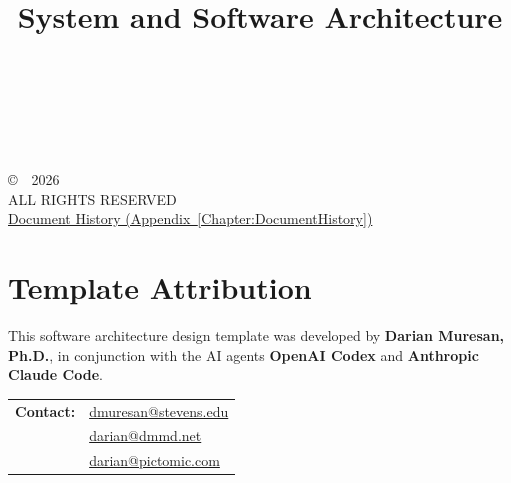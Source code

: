 \title{\ProjectName\\[0.5em]\large System and Software Architecture\\[1.5em]\normalsize\VERSION\\\DocumentStatus}
\author{\DocumentOwner\\\Organization}
\conferraldate{}{\DocumentDate}
\copyrightholder{\Organization}
\maketitle

\begin{copyrightpage}
\copyright\ \Organization\ 2026 \\
ALL RIGHTS RESERVED \\[0.2in]
\hyperref[Chapter:DocumentHistory]{Document History (Appendix~\ref*{Chapter:DocumentHistory})}
\end{copyrightpage}

\cleardoublepage
{}
\chapter*{Template Attribution}

This software architecture design template was developed by
\textbf{Darian Muresan, Ph.D.}, in conjunction with the AI agents
\textbf{OpenAI Codex} and \textbf{Anthropic Claude Code}.

\begin{tabularx}{\linewidth}{@{}L{3.0cm}Y@{}}
\textbf{Contact:} & \href{mailto:dmuresan@stevens.edu}{dmuresan@stevens.edu}\\
& \href{mailto:darian@dmmd.net}{darian@dmmd.net}\\
& \href{mailto:darian@pictomic.com}{darian@pictomic.com}
\end{tabularx}

\clearpage
\begin{abstract}
  
\end{abstract}

\contentspage
\tablelistpage
\figurelistpage
